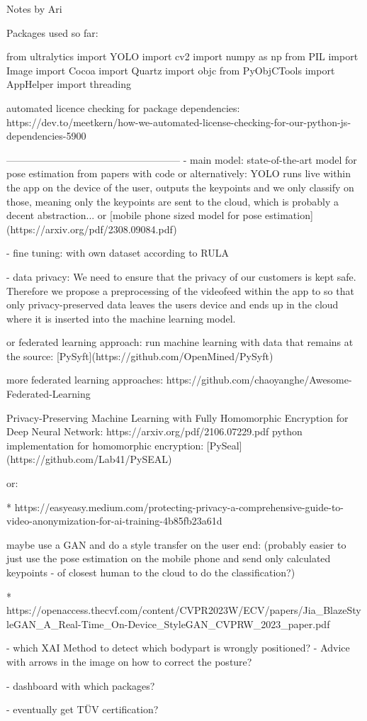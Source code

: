 
Notes by Ari

Packages used so far: 

from ultralytics import YOLO
import cv2
import numpy as np
from PIL import Image
import Cocoa
import Quartz
import objc
from PyObjCTools import AppHelper
import threading

automated licence checking for package dependencies:
https://dev.to/meetkern/how-we-automated-license-checking-for-our-python-js-dependencies-5900

-----------------------------------------------------
- main model:
state-of-the-art model for pose estimation from papers with code
or alternatively:
YOLO runs live within the app on the device of the user, outputs the keypoints 
and we only classify on those, meaning only the keypoints are sent to the cloud, 
which is probably a decent abstraction...
or
[mobile phone sized model for pose estimation](https://arxiv.org/pdf/2308.09084.pdf)

- fine tuning:
with own dataset according to RULA

- data privacy:
We need to ensure that the privacy of our customers is kept safe.
Therefore we propose a preprocessing of the videofeed within the app 
to so that only privacy-preserved data leaves the users device 
and ends up in the cloud where it is inserted into the machine learning model.

or federated learning approach:
run machine learning with data that remains at the source:
[PySyft](https://github.com/OpenMined/PySyft)

more federated learning approaches:
https://github.com/chaoyanghe/Awesome-Federated-Learning

Privacy-Preserving Machine Learning with Fully Homomorphic Encryption for Deep Neural Network:
https://arxiv.org/pdf/2106.07229.pdf
python implementation for homomorphic encryption: [PySeal](https://github.com/Lab41/PySEAL)

or:

* https://easyeasy.medium.com/protecting-privacy-a-comprehensive-guide-to-video-anonymization-for-ai-training-4b85fb23a61d

maybe use a GAN and do a style transfer on the user end:
(probably easier to just use the pose estimation on the mobile phone 
and send only calculated keypoints - of closest human to the cloud to do the classification?)

* https://openaccess.thecvf.com/content/CVPR2023W/ECV/papers/Jia_BlazeStyleGAN_A_Real-Time_On-Device_StyleGAN_CVPRW_2023_paper.pdf


- which XAI Method to detect which bodypart is wrongly positioned?
- Advice with arrows in the image on how to correct the posture?

- dashboard with which packages?

- eventually get TÜV certification?
